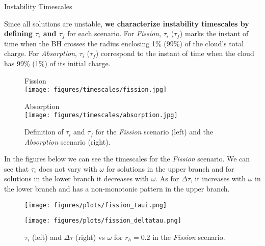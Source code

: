 \begin{block}{Instability Timescales}

Since all solutions are unstable, \textbf{we characterize instability timescales by defining $\tau_i$ and $\tau_f$} for each scenario. For \textit{Fission}, $\tau_i$ ($\tau_f$) marks the instant of time when the \gls{BH} crosses the radius enclosing 1\% (99\%) of the cloud's total charge. For \textit{Absorption}, $\tau_i$ ($\tau_f$) correspond to the instant of time when the cloud has 99\% (1\%) of its initial charge.

\begin{figure}[h!]
    \centering
    \begin{minipage}[b]{0.49\textwidth}
        \centering
        {\large \Raleway \textmd{Fission}} \\
        \vspace{0.75em}
        \texttt{[image: figures/timescales/fission.jpg]}
    \end{minipage}
    \hfill
    \begin{minipage}[b]{0.49\textwidth}
        \centering
        {\large \Raleway \textmd{Absorption}} \\
        \vspace{0.75em}
        \texttt{[image: figures/timescales/absorption.jpg]}
    \end{minipage}
    \caption{Definition of $\tau_i$ and $\tau_f$ for the \textit{Fission} scenario (left) and the \textit{Absorption} scenario (right).}
\end{figure}

In the figures below we can see the timescales for the \textit{Fission} scenario. We can see that $\tau_i$ does not vary with $\omega$ for solutions in the upper branch and for solutions in the lower branch it decreases with $\omega$. As for $\Delta \tau$, it increases with $\omega$ in the lower branch and has a non-monotonic pattern in the upper branch.

\begin{figure}[h!]
    \centering
    \begin{minipage}[b]{0.49\textwidth}
        \centering
        \texttt{[image: figures/plots/fission\_taui.png]}
    \end{minipage}
    \hfill
    \begin{minipage}[b]{0.49\textwidth}
        \centering
        \texttt{[image: figures/plots/fission\_deltatau.png]}
    \end{minipage}
    \caption{$\tau_i$ (left) and $\Delta \tau$ (right) vs $\omega$ for $r_h = 0.2$ in the \textit{Fission} scenario.}
\end{figure}


\end{block}
